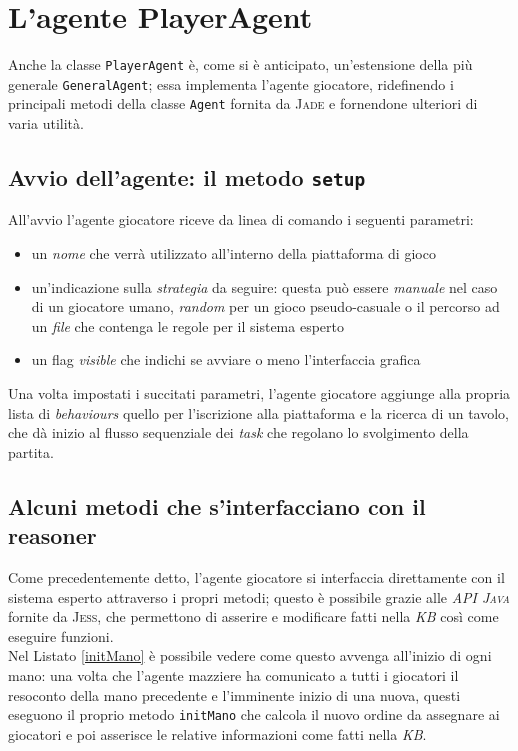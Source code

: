\section{L'agente PlayerAgent}

Anche la classe \texttt{PlayerAgent} è, come si è anticipato, un'estensione della più generale \texttt{GeneralAgent}; essa implementa l'agente giocatore, ridefinendo i principali metodi della classe \texttt{Agent} fornita da \textsc{Jade} e fornendone ulteriori di varia utilità.

\subsection{Avvio dell'agente: il metodo \texttt{setup}}

All'avvio l'agente giocatore riceve da linea di comando i seguenti parametri:
\begin{itemize}
   \item un \emph{nome} che verrà utilizzato all'interno della piattaforma di gioco
   \item un'indicazione sulla \emph{strategia} da seguire: questa può essere \emph{manuale} nel caso di un giocatore umano, \emph{random} per un gioco pseudo-casuale o il percorso ad un \emph{file} che contenga le regole per il sistema esperto
   \item un flag \emph{visible} che indichi se avviare o meno l'interfaccia grafica
\end{itemize}

\noindent
Una volta impostati i succitati parametri, l'agente giocatore aggiunge alla propria lista di \emph{behaviours} quello per l'iscrizione alla piattaforma e la ricerca di un tavolo, che dà inizio al flusso sequenziale dei \emph{task} che regolano lo svolgimento della partita.


\subsection{Alcuni metodi che s'interfacciano con il reasoner}

Come precedentemente detto, l'agente giocatore si interfaccia direttamente con il sistema esperto attraverso i propri metodi; questo è possibile grazie alle \emph{API \textsc{Java}} fornite da \textsc{Jess}, che permettono di asserire e modificare fatti nella \emph{KB} così come eseguire funzioni.\\
Nel Listato \ref{initMano} è possibile vedere come questo avvenga all'inizio di ogni mano: una volta che l'agente mazziere ha comunicato a tutti i giocatori il resoconto della mano precedente e l'imminente inizio di una nuova, questi eseguono il proprio metodo \texttt{initMano} che calcola il nuovo ordine da assegnare ai giocatori e poi asserisce le relative informazioni come fatti nella \emph{KB}.


